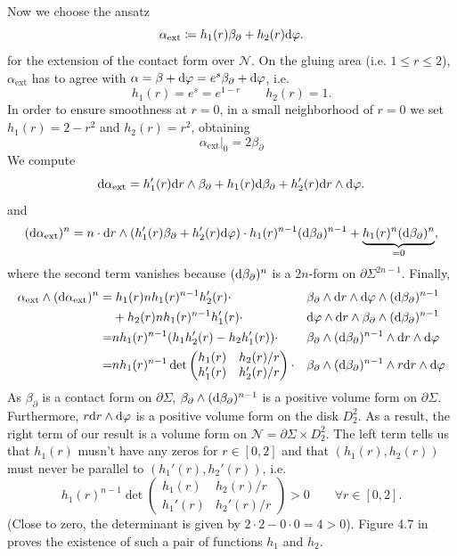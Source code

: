 Now we choose the ansatz
\[
    \alpha_\text{ext} \coloneqq h_1(r) \beta_\partial + h_2(r) \mathrm{d}\varphi.
\]
for the extension of the contact form over $\mathcal{N}$.
On the gluing area (i.e. $1 \le r \le 2$), $\alpha_\text{ext}$ has to agree with $\alpha = \beta + \mathrm{d} \varphi = e^s \beta_\partial + \mathrm{d} \varphi$,
i.e.
\[
    h_1(r) = e^s = e^{1-r} \qquad h_2(r) = 1.
\]
In order to ensure smoothness at $r=0$, in a small neighborhood of $r = 0$ we set $h_1(r) = 2 - r^2$ and $h_2(r) = r^2$, obtaining
\[
    \alpha_\text{ext}|_0 = 2\beta_\partial
\] 
We compute
\[
    \mathrm{d} \alpha_\text{ext} = h_1'(r)\mathrm{d} r\wedge \beta_\partial + h_1(r) \mathrm{d} \beta_\partial + h_2'(r) \mathrm{d} r \wedge \mathrm{d}\varphi.
\]
and
\[
    (\mathrm{d} \alpha_\text{ext})^n = n\cdot \mathrm{d} r\wedge (h_1'(r) \beta_\partial + h_2'(r) \mathrm{d}\varphi) \cdot h_1(r)^{n-1}(\mathrm{d} \beta_\partial)^{n-1} + \underbrace{h_1(r)^n (\mathrm{d} \beta_\partial)^n}_{=0},
\]
where the second term vanishes because $(\mathrm{d} \beta_\partial)^n$ is a $2n$-form on $\partial \Sigma^{2n-1}$.
Finally,
\begin{align*}
    \alpha_\text{ext} \wedge (\mathrm{d} \alpha_\text{ext})^n =& \;h_1(r)n h_1(r)^{n-1} h_2'(r) \cdot&&\beta_\partial \wedge \mathrm{d} r \wedge \mathrm{d} \varphi \wedge (\mathrm{d}\beta_\partial)^{n-1}\\
    &+ h_2(r)n h_1(r)^{n-1}h_1'(r) \cdot&&\mathrm{d} \varphi \wedge \mathrm{d} r \wedge \beta_\partial \wedge (\mathrm{d}\beta_\partial)^{n-1}\\
    =& n h_1(r)^{n-1}(h_1h_2'(r) - h_2h_1'(r)) \cdot &&\beta_\partial \wedge (\mathrm{d}\beta_\partial)^{n-1} \wedge \mathrm{d} r \wedge \mathrm{d} \varphi\\
    =& n h_1(r)^{n-1}\det \begin{pmatrix}
        h_1(r) & h_2(r)/r\\
        h_1'(r) & h_2'(r)/r
    \end{pmatrix} \cdot &&\beta_\partial \wedge (\mathrm{d}\beta_\partial)^{n-1} \wedge r \mathrm{d} r \wedge \mathrm{d} \varphi\\
\end{align*}
As $\beta_\partial$ is a contact form on $\partial \Sigma$, $\beta_\partial \wedge (\mathrm{d}\beta_\partial)^{n-1}$ is a positive volume form on $\partial \Sigma$. Furthermore, $r \mathrm{d} r\wedge \mathrm{d} \varphi$ is a positive volume form on the disk $D_2^2$. As a result, the right term of our result is a volume form on $\mathcal{N} = \partial \Sigma \times D_2^2$.
The left term tells us that $h_1(r)$ musn't have any zeros for $r \in [0,2]$ and that $(h_1(r), h_2(r))$ must never be parallel to $(h_1'(r), h_2'(r))$, i.e.
\[
    h_1(r)^{n-1}\det \begin{pmatrix}
        h_1(r) & h_2(r)/r\\
        h_1'(r) & h_2'(r)/r
    \end{pmatrix} > 0 \qquad \forall r \in [0,2].
\]
(Close to zero, the determinant is given by $2 \cdot 2 - 0 \cdot 0 = 4 > 0$).
Figure 4.7 in \cite{Geiges08} proves the existence of such a pair of functions $h_1$ and $h_2$.


